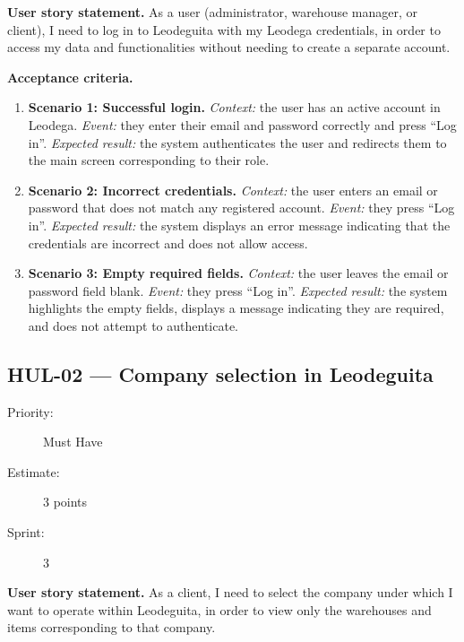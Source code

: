 \documentclass[11pt,a4paper,oneside]{report}
\begin{document}
\textbf{User story statement.} As a user (administrator, warehouse manager, or client), I need to log in to Leodeguita with my Leodega credentials, in order to access my data and functionalities without needing to create a separate account.

\textbf{Acceptance criteria.}
\begin{enumerate}
\item \textbf{Scenario 1: Successful login.} \emph{Context:} the user has an active account in Leodega. \emph{Event:} they enter their email and password correctly and press ``Log in''. \emph{Expected result:} the system authenticates the user and redirects them to the main screen corresponding to their role.
\item \textbf{Scenario 2: Incorrect credentials.} \emph{Context:} the user enters an email or password that does not match any registered account. \emph{Event:} they press ``Log in''. \emph{Expected result:} the system displays an error message indicating that the credentials are incorrect and does not allow access.
\item \textbf{Scenario 3: Empty required fields.} \emph{Context:} the user leaves the email or password field blank. \emph{Event:} they press ``Log in''. \emph{Expected result:} the system highlights the empty fields, displays a message indicating they are required, and does not attempt to authenticate.
\end{enumerate}

\subsection{HUL-02 --- Company selection in Leodeguita}
\label{req:HUL-02}
\begin{description}
\item[Priority:] Must Have \quad \item[Estimate:] 3 points \quad \item[Sprint:] 3
\end{description}

\textbf{User story statement.} As a client, I need to select the company under which I want to operate within Leodeguita, in order to view only the warehouses and items corresponding to that company.
\end{document}
